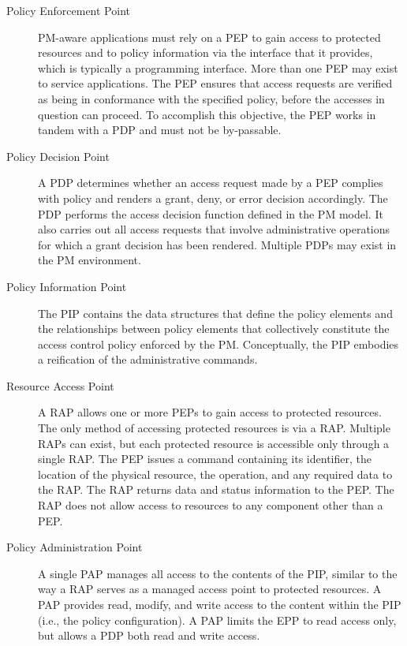 \documentclass[12pt,a4paper,titlepage]{book}
\begin{document}
	\begin{description}
		
		\item[Policy Enforcement Point] PM-aware applications must rely on a PEP to gain access to protected resources and to policy information via the interface that it provides, which is typically a programming interface. More than one PEP may exist to service applications. The PEP ensures that access requests are verified as being in conformance with the specified policy, before the accesses in question can proceed. To accomplish this objective, the PEP works in tandem with a PDP and must not be by-passable.
		
		\item[Policy Decision Point] A PDP determines whether an access request made by a PEP complies with policy and renders a grant, deny, or error decision accordingly. The PDP performs the access decision function defined in the PM model. It also carries out all access requests that involve administrative operations for which a grant decision has been rendered. Multiple PDPs may exist in the PM environment.
		
		\item[Policy Information Point] The PIP contains the data structures that define the policy elements and the relationships between policy elements that collectively constitute the access control policy enforced by the PM. Conceptually, the PIP embodies a reification of the administrative commands.
		
		\item[Resource Access Point] A RAP allows one or more PEPs to gain access to protected resources. The only method of accessing protected resources is via a RAP. Multiple RAPs can exist, but each protected resource is accessible only through a single RAP. The PEP issues a command containing its identifier, the location of the physical resource, the operation, and any required data to the RAP. The RAP returns data and status information to the PEP. The RAP does not allow access to resources to any component other than a PEP.

		\item[Policy Administration Point] A single PAP manages all access to the contents of the PIP, similar to the way a RAP serves as a managed access point to protected resources. A PAP provides read, modify, and write access to the content within the PIP (i.e., the policy configuration). A PAP limits the EPP to read access only, but allows a PDP both read and write access.
		

\end{description}
\end{document}
